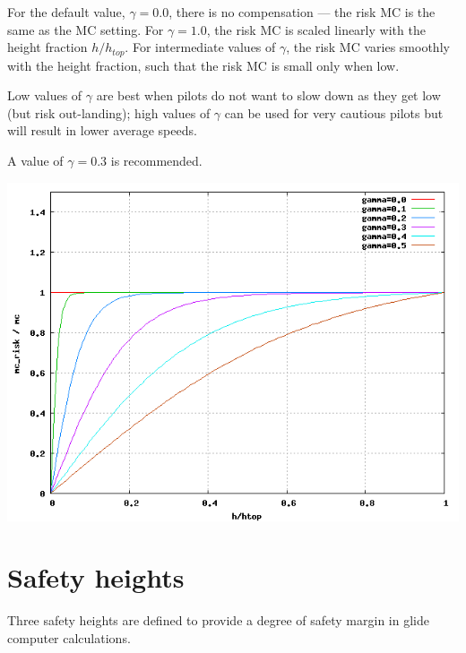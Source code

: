 \documentclass[a4paper,12pt]{refrep}
\begin{document}
  For the default value, $\gamma=0.0$, there is no compensation ---
  the risk MC is the same as the MC setting.  For $\gamma=1.0$, the
  risk MC is scaled linearly with the height fraction $h/h_{top}$.
  For intermediate values of $\gamma$, the risk MC varies smoothly
  with the height fraction, such that the risk MC is small only when
  low.

  Low values of $\gamma$ are best when pilots do not want to slow down
  as they get low (but risk out-landing); high values of $\gamma$ can
  be used for very cautious pilots but will result in lower average
  speeds.

  A value of $\gamma=0.3$ is recommended.

\begin{center}
\includegraphics[angle=0,width=\linewidth,keepaspectratio='true']{figures/riskmc.png}
\end{center}

\section{Safety heights}\label{sec:safety-heights}

Three safety heights are defined to provide a degree of safety margin
in glide computer calculations.  
\end{document}
